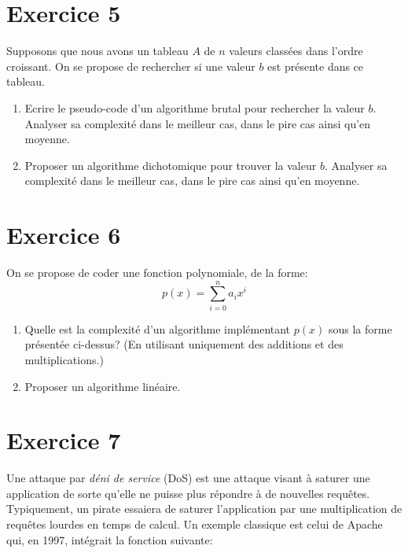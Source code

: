\documentclass[a4paper,10pt]{article}
\begin{document}
\section*{Exercice 5}

Supposons que nous avons un tableau $A$ de $n$ valeurs classées dans l'ordre
croissant. On se propose de rechercher si une valeur $b$ est présente dans ce
tableau.

\begin{enumerate}

\item Ecrire le pseudo-code d'un algorithme brutal pour rechercher la valeur
$b$.  Analyser sa complexité dans le meilleur cas, dans le pire cas ainsi qu'en
moyenne.

\item Proposer un algorithme dichotomique pour trouver la valeur $b$. Analyser
sa complexité dans le meilleur cas, dans le pire cas ainsi qu'en moyenne.

\end{enumerate}

\section*{Exercice 6}

On se propose de coder une fonction polynomiale, de la forme:
$$
p(x) = \sum_{i=0}^n a_i x^i
$$

\begin{enumerate}

\item Quelle est la complexité d'un algorithme implémentant $p(x)$ sous la forme présentée ci-dessus? (En utilisant uniquement des additions et des multiplications.)

\item Proposer un algorithme linéaire.

\end{enumerate}

\section*{Exercice 7}

Une attaque par \textit{déni de service} (DoS) est une attaque visant à saturer
une application de sorte qu'elle ne puisse plus répondre à de nouvelles
requêtes. Typiquement, un pirate essaiera de saturer l'application par une
multiplication de requêtes lourdes en temps de calcul. Un exemple classique est
celui de Apache qui, en 1997, intégrait la fonction suivante:
\end{document}
